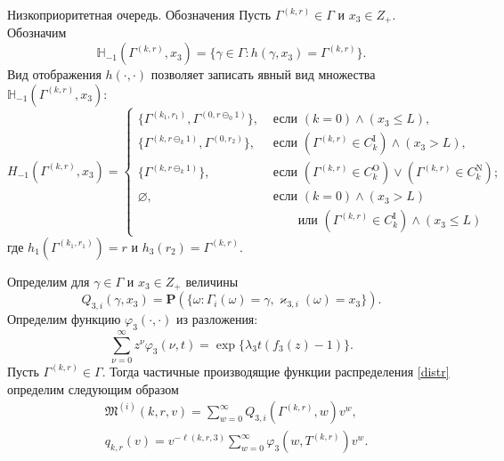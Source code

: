\documentclass[10pt]{beamer}
\begin{document}
\begin{frame}[allowframebreaks]{Низкоприоритетная очередь. Обозначения}
Пусть $\Gamma^{(k,r)}\in \Gamma$ и $x_3 \in Z_+$. Обозначим 
$$
{\mathbb H}_{-1}(\Gamma^{(k,r)}, x_3) = \{\gamma \in \Gamma \colon h(\gamma, x_3) = \Gamma^{(k,r)}\}.
$$
Вид отображения $h(\cdot,\cdot)$ позволяет записать явный вид множества ${\mathbb H}_{-1}(\Gamma^{(k,r)}, x_3)$:
\begin{equation*}
H_{-1}(\Gamma^{(k,r)}, x_3) = 
\begin{cases}
\bigl\{\Gamma^{(k_1,r_1)}, \Gamma^{(0,r\ominus_0 1)}\bigr\},&  \text{ если  $(k=0) \wedge (x_3 \leqslant L)$,}\\
\bigl\{\Gamma^{(k,r\ominus_k 1)}, \Gamma^{(0,r_2)}\bigr\},&  \text{ если  $(\Gamma^{(k,r)}\in C_k^{\mathrm{I}})
  \wedge (x_3>L)$,}\\ 
\bigl\{\Gamma^{(k,r\ominus_k 1)}\bigr\},&  \text{ если  $(\Gamma^{(k,r)}\in C_k^{\mathrm{O}}) \vee (\Gamma^{(k,r)}\in C_k^{\mathrm{N}})$;}\\
\varnothing,&  \text{ если  $(k = 0)\wedge  (x_3>L)$}\\
 & \qquad \text{ или $(\Gamma^{(k,r)}\in C_k^{\mathrm{I}}) \wedge (x_3\leqslant L)$}
\end{cases}
\end{equation*}
где $h_1(\Gamma^{(k_1,r_1)})=r$ и $h_3(r_2)=\Gamma^{(k,r)}$.
\framebreak

Определим для  $\gamma \in \Gamma$ и $x_3 \in Z_+$ величины
\begin{equation}
Q_{3,i}(\gamma,x_3) = {\mathbf P}(\{\omega\colon \Gamma_{i}(\omega)=\gamma, \varkappa_{3,i}(\omega)=x_3\}).
\label{distr}
\end{equation}
Определим функцию $\varphi_3(\cdot,\cdot)$ из разложения:
\begin{equation}
\sum_{\nu=0}^{\infty} z^\nu\varphi_3(\nu,t) = \exp\{\lambda_3 t (f_3(z)-1)\}.
\end{equation}
Пусть $\Gamma^{(k,r)}\in \Gamma$. Тогда частичные производящие функции распределения \eqref{distr} определим следующим образом
\begin{align}
&\mathfrak{M}^{(i)}(k,r,v) = \sum_{w=0}^{\infty} Q_{3,i}(\Gamma^{(k,r)},w) v^w,\\
&q_{k,r}(v) = v^{-\ell(k,r,3)}\sum_{w=0}^{\infty} \varphi_3(w,T^{(k,r)})v^w.
\end{align}
\end{frame}
\end{document}
